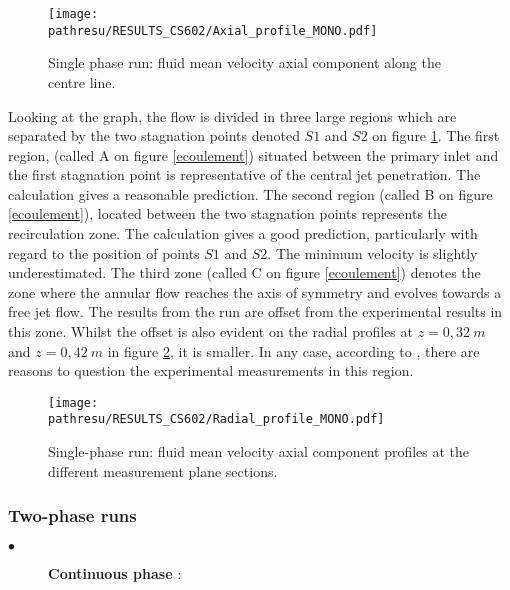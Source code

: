 \documentclass[a4paper,twoside,12pt]{article}
\newcommand{\pathresu}{./FIGURES}
\begin{document}
\begin{figure}[h]
   \centerline{\texttt{[image: \\pathresu/RESULTS\_CS602/Axial\_profile\_MONO.pdf]}}
   \caption{Single phase run: fluid mean velocity axial component along the centre line.}
   \label{AxeFluide_mono}
\end{figure}

\noindent
Looking at the graph, the flow is divided in three large regions which are separated by the two stagnation points denoted $S1$ and $S2$ on figure \ref{AxeFluide_mono}. The first region, (called A on figure \ref{ecoulement}) situated between the primary inlet and the first stagnation point is representative of the central jet penetration. The calculation gives a reasonable prediction. The second region (called B on figure \ref{ecoulement}), located between the two stagnation points represents the recirculation zone. The calculation gives a good prediction, particularly with regard to the position of points $S1$ and $S2$. The minimum velocity is slightly underestimated. The third zone (called C on figure \ref{ecoulement}) denotes the zone where the annular flow reaches the axis of symmetry and evolves towards a free jet flow. The results from the run are offset from the experimental results in this zone. Whilst the offset is also evident on the radial profiles at $z=0,32~m$ and $z=0,42~m$ in figure \ref{ProfVZFluide_mono}, it is smaller. In any case, according to \cite{Rap3}, there are reasons to question the experimental measurements in this region.

\begin{figure}[h]
   \centerline{\texttt{[image: \\pathresu/RESULTS\_CS602/Radial\_profile\_MONO.pdf]}}
   \caption{Single-phase run: fluid mean velocity axial component profiles at the different measurement plane sections.}
   \label{ProfVZFluide_mono}
\end{figure}

\clearpage

\subsubsection{Two-phase runs}

\begin{description}
   \item[$\bullet$] \textbf{Continuous phase} :
\end{description}
\end{document}
